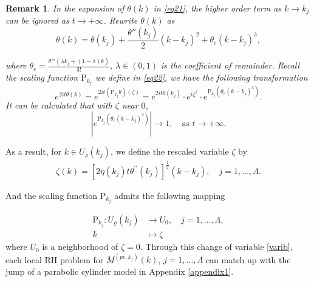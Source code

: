 \documentclass[11pt]{article}
\numberwithin{equation}{section}
\newtheorem{remark}{Remark}
\begin{document}

\begin{remark}\label{r3}
    In the expansion of $\theta(k)$ in \eqref{eq21}, the higher order term as $k\to k_j$ can be ignored as $t\to+\infty$. Rewrite $\theta(k)$ as\[
\theta(k) = \theta(k_j) + \frac{\theta''(k_j)}{2} (k - k_j)^2 + \theta_c (k - k_j)^3,
\]

where $\theta_c = \frac{\theta'''(\lambda k_j + (1-\lambda)k)}{3!}$, $\lambda \in (0, 1)$ is the coefficient of remainder.
Recall the scaling function $\mathrm{P}_{k_j}$ we define in \eqref{eq22}, we have the following transformation
\begin{equation*}
e^{2it\theta(k)} = e^{2it(\mathrm{P}_{k_j}\theta)(\zeta)}= e^{2it\theta(k_j)} \cdot e^{i\zeta^2}\cdot e^{\mathrm{P}_{k_j}(\theta_c(k-k_j)^3)}.
\end{equation*}
It can be calculated that with $\zeta$ near $0$,
\begin{equation*}
\left| e^{\mathrm{P}_{k_j}(\theta_c(k-k_j)^3)} \right|  \to 1, \quad \text{as } t \to +\infty.
\end{equation*}
\end{remark}


As a result, for $k \in U_{\varrho}\left(k_j\right)$, we define the rescaled variable $\zeta$ by
\begin{align}
\zeta(k)=\left[2 \eta(k_j)t \theta^{\prime \prime}\left(k_j\right)\right]^{\frac{1}{2}}\left(k-k_j\right),\quad j=1,\dots,\Lambda. \label{varib}
\end{align}

And the scaling function $\mathrm{P}_{k_j}$ admits the following mapping

\begin{equation}\label{eq22}
\begin{aligned}
\mathrm{P}_{k_j}  : U_{\varrho}\left(k_j\right) &\longrightarrow U_0, \quad j=1,\dots,\Lambda, \\
 k &\longmapsto \zeta
\end{aligned}
\end{equation}
where $U_0$ is a neighborhood of $\zeta=0$.
Through this change of variable \eqref{varib}, each  local RH problem  for $M^{(pc, k_j)}(k)$, $j = 1,\dots, \Lambda$ can  match up with the jump of a parabolic cylinder model  in Appendix \ref{appendix1}.
\end{document}
